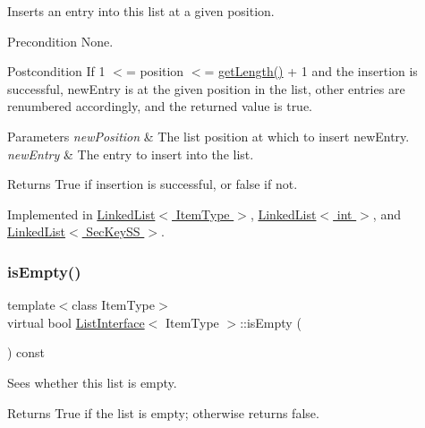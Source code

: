 Inserts an entry into this list at a given position. \begin{DoxyPrecond}{Precondition}
None. 
\end{DoxyPrecond}
\begin{DoxyPostcond}{Postcondition}
If 1 $<$= position $<$= \hyperlink{classListInterface_afc85695d4137f1e29ff02e179c9f3221}{get\+Length()} + 1 and the insertion is successful, new\+Entry is at the given position in the list, other entries are renumbered accordingly, and the returned value is true. 
\end{DoxyPostcond}

\begin{DoxyParams}{Parameters}
{\em new\+Position} & The list position at which to insert new\+Entry. \\
\hline
{\em new\+Entry} & The entry to insert into the list. \\
\hline
\end{DoxyParams}
\begin{DoxyReturn}{Returns}
True if insertion is successful, or false if not. 
\end{DoxyReturn}


Implemented in \hyperlink{classLinkedList_ae8a19375505e87e2e4fc0e9b5afe4d4d}{Linked\+List$<$ Item\+Type $>$}, \hyperlink{classLinkedList_ae8a19375505e87e2e4fc0e9b5afe4d4d}{Linked\+List$<$ int $>$}, and \hyperlink{classLinkedList_ae8a19375505e87e2e4fc0e9b5afe4d4d}{Linked\+List$<$ Sec\+Key\+S\+S $>$}.

\mbox{\label{classListInterface_a924f91e7f81d7dcd3fda79bbcc671394}} 
\subsubsection{\texorpdfstring{is\+Empty()}{isEmpty()}}
{\footnotesize\ttfamily template$<$class Item\+Type$>$ \\
virtual bool \hyperlink{classListInterface}{List\+Interface}$<$ Item\+Type $>$\+::is\+Empty (\begin{DoxyParamCaption}{ }\end{DoxyParamCaption}) const\hspace{0.3cm}{\ttfamily [pure virtual]}}

Sees whether this list is empty. \begin{DoxyReturn}{Returns}
True if the list is empty; otherwise returns false. 
\end{DoxyReturn}


